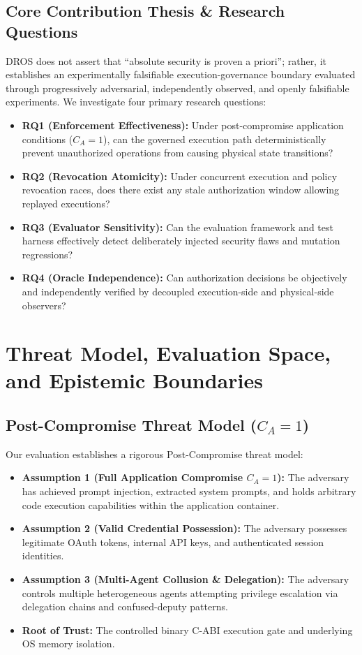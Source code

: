 \documentclass[conference]{IEEEtran}
\begin{document}
\subsection{Core Contribution Thesis \& Research Questions}
DROS does not assert that ``absolute security is proven a priori''; rather, it establishes an experimentally falsifiable execution-governance boundary evaluated through progressively adversarial, independently observed, and openly falsifiable experiments. We investigate four primary research questions:
\begin{itemize}
    \item \textbf{RQ1 (Enforcement Effectiveness):} Under post-compromise application conditions ($C_A = 1$), can the governed execution path deterministically prevent unauthorized operations from causing physical state transitions?
    \item \textbf{RQ2 (Revocation Atomicity):} Under concurrent execution and policy revocation races, does there exist any stale authorization window allowing replayed executions?
    \item \textbf{RQ3 (Evaluator Sensitivity):} Can the evaluation framework and test harness effectively detect deliberately injected security flaws and mutation regressions?
    \item \textbf{RQ4 (Oracle Independence):} Can authorization decisions be objectively and independently verified by decoupled execution-side and physical-side observers?
\end{itemize}

\section{Threat Model, Evaluation Space, and Epistemic Boundaries}

\subsection{Post-Compromise Threat Model ($C_A = 1$)}
Our evaluation establishes a rigorous Post-Compromise threat model:
\begin{itemize}
    \item \textbf{Assumption 1 (Full Application Compromise $C_A = 1$):} The adversary has achieved prompt injection, extracted system prompts, and holds arbitrary code execution capabilities within the application container.
    \item \textbf{Assumption 2 (Valid Credential Possession):} The adversary possesses legitimate OAuth tokens, internal API keys, and authenticated session identities.
    \item \textbf{Assumption 3 (Multi-Agent Collusion \& Delegation):} The adversary controls multiple heterogeneous agents attempting privilege escalation via delegation chains and confused-deputy patterns.
    \item \textbf{Root of Trust:} The controlled binary C-ABI execution gate and underlying OS memory isolation.
\end{itemize}
\end{document}
